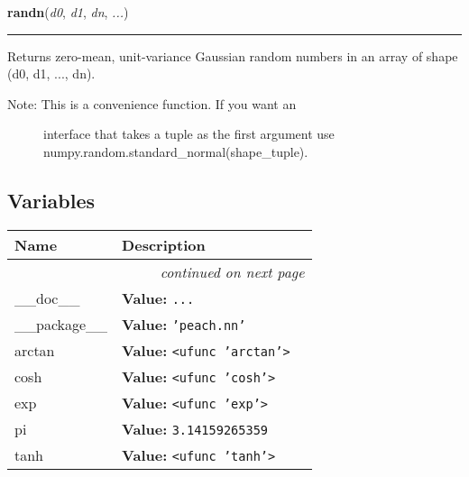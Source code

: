 \hspace{.8\funcindent}\begin{boxedminipage}{\funcwidth}

    \raggedright \textbf{randn}(\textit{d0}, \textit{d1}, \textit{dn}, \textit{...})

    \vspace{-1.5ex}

    \rule{\textwidth}{0.5\fboxrule}
\setlength{\parskip}{2ex}

Returns zero-mean, unit-variance Gaussian random numbers in an
array of shape (d0, d1, ..., dn).
%
\begin{description}
\item[{Note:  This is a convenience function. If you want an}] \leavevmode 
interface that takes a tuple as the first argument
use numpy.random.standard\_normal(shape\_tuple).

\end{description}
\setlength{\parskip}{1ex}
    \end{boxedminipage}



  \subsection{Variables}

    \vspace{-1cm}
\hspace{\varindent}\begin{longtable}{|p{\varnamewidth}|p{\vardescrwidth}|l}
\cline{1-2}
\cline{1-2} \centering \textbf{Name} & \centering \textbf{Description}& \\
\cline{1-2}
\endhead\cline{1-2}\multicolumn{3}{r}{\small\textit{continued on next page}}\\\endfoot\cline{1-2}
\endlastfoot\raggedright \_\-\_\-d\-o\-c\-\_\-\_\- & \raggedright \textbf{Value:} 
{\tt \texttt{...}}&\\
\cline{1-2}
\raggedright \_\-\_\-p\-a\-c\-k\-a\-g\-e\-\_\-\_\- & \raggedright \textbf{Value:} 
{\tt \texttt{'}\texttt{peach.nn}\texttt{'}}&\\
\cline{1-2}
\raggedright a\-r\-c\-t\-a\-n\- & \raggedright \textbf{Value:} 
{\tt {\textless}ufunc 'arctan'{\textgreater}}&\\
\cline{1-2}
\raggedright c\-o\-s\-h\- & \raggedright \textbf{Value:} 
{\tt {\textless}ufunc 'cosh'{\textgreater}}&\\
\cline{1-2}
\raggedright e\-x\-p\- & \raggedright \textbf{Value:} 
{\tt {\textless}ufunc 'exp'{\textgreater}}&\\
\cline{1-2}
\raggedright p\-i\- & \raggedright \textbf{Value:} 
{\tt 3.14159265359}&\\
\cline{1-2}
\raggedright t\-a\-n\-h\- & \raggedright \textbf{Value:} 
{\tt {\textless}ufunc 'tanh'{\textgreater}}&\\
\cline{1-2}
\end{longtable}


